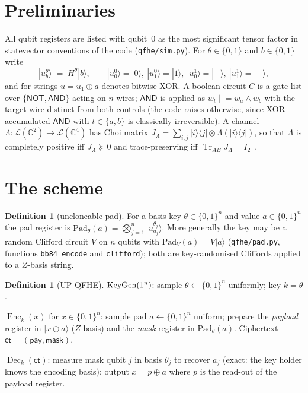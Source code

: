 \documentclass[11pt]{article}
\theoremstyle{definition}
\newtheorem{definition}[theorem]{Definition}
\newcommand{\tr}{\operatorname{Tr}}
\DeclareMathOperator{\Enc}{Enc} \DeclareMathOperator{\Dec}{Dec}
\begin{document}
\section{Preliminaries}\label{sec:prelim}

All qubit registers are listed with qubit~0 as the most significant tensor
factor in statevector conventions of the code (\texttt{qfhe/sim.py}).  For
$\theta \in \{0,1\}$ and $b \in \{0,1\}$ write
\[
  |u_b^\theta\rangle \;=\; H^{\theta}|b\rangle, \qquad
  |u_0^0\rangle=|0\rangle,\ |u_1^0\rangle=|1\rangle,\
  |u_0^1\rangle=|+\rangle,\ |u_1^1\rangle=|-\rangle ,
\]
and for strings $u = u_1 \oplus a$ denotes bitwise XOR.  A boolean circuit $C$
is a gate list over $\{\mathsf{NOT},\mathsf{AND}\}$ acting on $n$ wires;
$\mathsf{AND}$ is applied as $w_t \mathrel{|}= w_a \wedge w_b$ with the target
wire distinct from both controls (the code raises otherwise, since XOR-accumulated
$\mathsf{AND}$ with $t \in \{a,b\}$ is classically irreversible).  A channel
$\Lambda: \mathcal{L}(\mathbb{C}^2) \to \mathcal{L}(\mathbb{C}^4)$ has Choi
matrix $J_\Lambda = \sum_{i,j} |i\rangle\langle j| \otimes \Lambda(|i\rangle\langle j|)$,
so that $\Lambda$ is completely positive iff $J_\Lambda \succeq 0$ and
trace-preserving iff $\tr_{AB} J_\Lambda = I_2$~\cite{watrous}.

\section{The scheme}\label{sec:scheme}

\begin{definition}[uncloneable pad]\label{def:pad}
For a basis key $\theta \in \{0,1\}^n$ and value $a \in \{0,1\}^n$ the pad
register is
$\mathrm{Pad}_\theta(a) = \bigotimes_{j=1}^{n} |u_{a_j}^{\theta_j}\rangle$.
More generally the key may be a random Clifford circuit $V$ on $n$ qubits with
$\mathrm{Pad}_V(a) = V|a\rangle$ (\texttt{qfhe/pad.py}, functions
\texttt{bb84\_encode} and \texttt{clifford}); both are key-randomised Cliffords
applied to a $Z$-basis string.
\end{definition}

\begin{definition}[UP-QFHE]\label{def:scheme}
$\operatorname{KeyGen}(1^n)$: sample $\theta \leftarrow \{0,1\}^n$ uniformly; key $k=\theta$.

$\Enc_k(x)$ for $x \in \{0,1\}^n$: sample pad $a \leftarrow \{0,1\}^n$ uniform;
prepare the \emph{payload} register in $|x \oplus a\rangle$ ($Z$ basis) and the
\emph{mask} register in $\mathrm{Pad}_\theta(a)$.  Ciphertext
$\mathsf{ct} = (\mathsf{pay}, \mathsf{mask})$.

$\Dec_k(\mathsf{ct})$: measure mask qubit $j$ in basis $\theta_j$ to recover
$a_j$ (exact: the key holder knows the encoding basis); output $x = p \oplus a$
where $p$ is the read-out of the payload register.
\end{definition}
\end{document}
